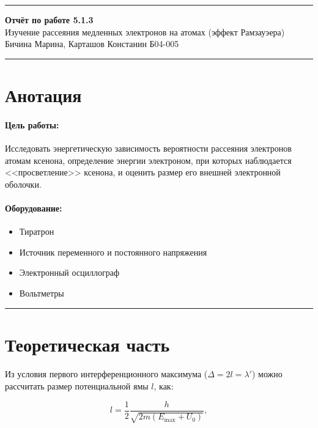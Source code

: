 \documentclass[a4paper,12pt]{article} %
\begin{document}


\hrule 	
\medskip
\begin{raggedright}
{\large \textbf{Отчёт по работе 5.1.3}}
\\
\medskip
{\Large Изучение рассеяния медленных электронов на атомах (эффект Рамзауэера)} 
\\
\medskip
{\large Бичина Марина, Карташов Констанин Б04-005}
\medskip
\hrule
\medskip
\end{raggedright}


\section{Анотация}

\paragraph{Цель работы:} 
Исследовать энергетическую зависимость вероятности рассеяния электронов атомам ксенона, определение энергии электроном, при которых наблюдается <<просветление>> ксенона, и оценить размер его внешней электронной оболочки.

\paragraph{Оборудование:}
\begin{itemize}
\renewcommand{\labelitemi}{$\triangleright$}
\itemsep0em
\item Тиратрон
\item Источник переменного и постоянного напряжения
\item Электронный осциллограф
\item Вольтметры
\end{itemize}


\medskip\hrule\medskip

\section{Теоретическая часть}

\paragraph{} Из условия первого интерференционного максимума ($\Delta = 2l = \lambda'$) можно рассчитать размер потенциальной ямы $l$, как:

\begin{equation}\label{e:max}
l = \frac{1}{2} \frac{h}{\sqrt{2m(E_{\max} + U_0)}},
\end{equation}
\end{document}
